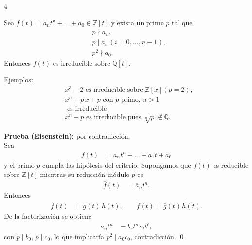 \documentclass[landscape,a4paper]{article}
\begin{document}
\begin{multicols}{4}
\begin{tcolorbox}[colback=white,colframe=red!80!black,colbacktitle=red!80!black,
                  coltitle=white,title={Teorema:Criterio de Eisenstein (p.~6, col.~2)}]
Sea $f(t) = a_n t^n + \dots + a_0 \in \mathbb{Z}[t]$
y exista un primo $p$ tal que
\begin{align*}
  &p \nmid a_n, \quad\\
  &p \mid a_i \;(i=0,\dots,n-1), \\
  &p^2 \nmid a_0.
\end{align*}
Entonces $f(t)$ es irreducible sobre $\mathbb{Q}[t]$.
\end{tcolorbox}
\noindent Ejemplos:
\begin{align*}
  &x^3 - 2 \text{ es irreducible sobre }\mathbb{Z}[x] (p=2),\\
  &x^n + p\,x + p\text{ con } p \text{ primo, } n>1 \\ &\text{ es irreducible}\\
  &x^n - p \text{ es irreducible pues } \sqrt[n]{p} \notin \mathbb{Q}.
\end{align*}

\noindent \textbf{Prueba (Eisenstein):} por contradicción.\\
Sea
\begin{align*}
  f(t) &= a_n t^n + \dots + a_1 t + a_0
\end{align*}
y el primo $p$ cumpla las hipótesis del criterio.  
Supongamos que $f(t)$ es reducible sobre $\mathbb{Z}[t]$ mientras su reducción módulo $p$ es
\begin{align*}
  \overline{f}(t) &= \overline{a}_n t^n.
\end{align*}
Entonces
\begin{align*}
  f(t) &= g(t)\,h(t),\qquad
  \overline{f}(t)=\overline{g}(t)\,\overline{h}(t).
\end{align*}
De la factorización se obtiene
\begin{align*}
  \overline{a}_n t^n &= b_s t^s \, c_\ell t^\ell,
\end{align*}
con $p\mid b_0$, $p\mid c_0$, lo que implicaría $p^2 \mid a_0c_0$, contradicción. \qed


\end{multicols}
\end{document}
